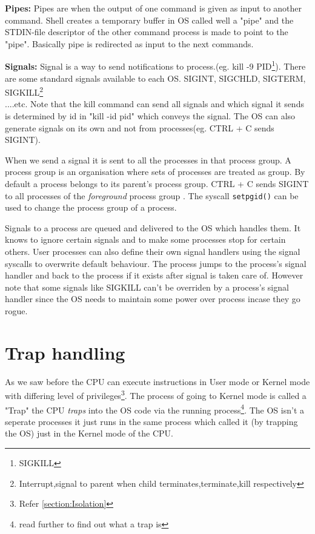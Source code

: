 \documentclass[12pt]{article}
\newcommand{\tbox}[1]{\noindent\fbox{\parbox{\textwidth}{#1}}}
\begin{document}
\textbf{Pipes:}
Pipes are when the output of one command is given as input to another command.
Shell creates a temporary buffer in OS called well a "pipe" and the STDIN-file descriptor of the other command process is made to point to the 
"pipe". Basically pipe is redirected as input to the next commands.


\textbf{Signals:}
Signal is a way to send notifications to process.(eg. kill -9 PID\footnote{SIGKILL}). There are some standard signals available to each OS. SIGINT, SIGCHLD, SIGTERM, SIGKILL\footnote{Interrupt,signal to parent when child terminates,terminate,kill respectively}\\....etc.
Note that the kill command can send all signals and which signal it sends is determined by id in "kill -id pid" which conveys the signal. The OS can also
generate signals on its own and not from processes(eg. CTRL + C sends SIGINT).


When we send a signal it is sent to all the processes in that process group. A process group is an organisation where sets of processes
are treated as group. By default a process belongs to its parent's process group. CTRL + C sends SIGINT to all processes of the \textit{foreground} process group
. The syscall \texttt{setpgid()} can be used to change the process group of a process.


Signals to a process are queued and delivered to the OS which handles them. It knows to ignore certain signals and to 
make some processes stop for certain others. User processes can also define their own signal handlers using the signal syscalls to overwrite default behaviour.
 The process jumps to the process's signal handler and back to the process if it exists after signal is taken care of.
However note that some signals like SIGKILL can't be overriden by a process's signal handler since the OS needs to maintain some power over process incase they go rogue.
\\
\newpage
\noindent\tbox{
    \begin{center}
    \textbf{\Huge Lecture 6}
    \end{center}
}

\section{Trap handling}
\label{section:trap}
As we saw before the CPU can execute instructions in User mode or Kernel mode with differing level of privileges\footnote{Refer \ref{section:Isolation}}.
The process of going to Kernel mode is called a "Trap" the CPU \textit{traps} into the OS code via the running process\footnote{read further to find out what a trap is}.
The OS isn't a seperate processes it just runs in the same process which called it (by trapping the OS) just in the Kernel mode of the CPU.
\end{document}
